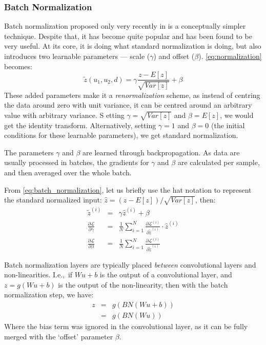 \subsubsection{Batch Normalization}
      Batch normalization proposed only very recently in
      \citep{ioffe_batch_2015} is a conceptually simpler technique. Despite
      that, it has become quite popular and has been found to be very useful.
      At its core, it is doing what standard normalization is doing, but also
      introduces two learnable parameters --- scale ($\gamma$) and offset
      ($\beta$).
      \autoref{eq:normalization} becomes:
      \begin{equation}
        \tilde{z}(u_1,u_2,d) = \gamma\frac{z-E[z]}{\sqrt{Var[z]}} + \beta 
				\label{eq:batch_normalization}
      \end{equation}
      These added parameters make it a \emph{renormalization} scheme, as instead of
      centring the data around zero with unit variance, it can be centred
      around an arbitrary value with arbitrary variance. S etting
      $\gamma = \sqrt{Var[z]}$ and $\beta = E[z]$, we would get the identity
      transform. Alternatively, setting $\gamma = 1$ and $\beta = 0$ (the
      initial conditions for these learnable parameters), we get standard
      normalization.
      
      The parameters $\gamma$ and $\beta$ are learned through backpropagation.
      As data are usually processed in batches, the gradients for $\gamma$ and
      $\beta$ are calculated per sample, and then averaged over the whole
      batch.

      From \autoref{eq:batch_normalization}, let us briefly use the hat
      notation to represent the standard normalized input:
      $\hat{z} = (z-E[z])/\sqrt{Var[z]}$, then:
      \begin{eqnarray}
        \tilde{z}^{(i)} & = & \gamma \hat{z}^{(i)} + \beta \nonumber\\
        \frac{\partial \mathcal{L}}{\partial \gamma}& =&
        \frac{1}{N}\sum_{i=1}^{N} \frac{\partial
        \mathcal{L}^{(i)}}{\partial \tilde{z}^{(i)}} \cdot \hat{z}^{(i)} \\
        \frac{\partial \mathcal{L}}{\partial \beta}& =&
        \frac{1}{N}\sum_{i=1}^{N} \frac{\partial
        \mathcal{L}^{(i)}}{\partial \tilde{z}^{(i)}} 
      \end{eqnarray}

      Batch normalization layers are typically placed \emph{between} convolutional layers
      and non-linearities. I.e.,\ if $Wu+b$ is the output of a convolutional
      layer, and $z=g(Wu+b)$ is the output of the non-linearity, then with the
      batch normalization step, we have:
      \begin{eqnarray}
        z &=& g(BN(Wu+b)) \nonumber\\
          &=& g(BN(Wu))
      \end{eqnarray}
      Where the bias term was ignored in the convolutional layer, as it can be
      fully merged with the `offset' parameter $\beta$.

